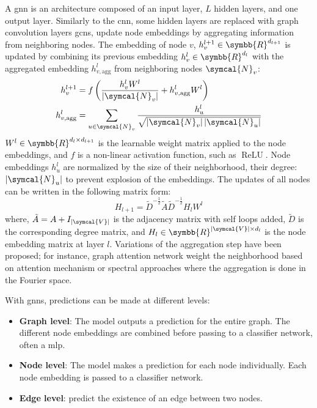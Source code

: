 \documentclass[../main.tex]{subfiles}
\begin{document}
		A \gls{gnn} is an architecture composed of an input layer, \(L\) hidden layers, and one output layer.
		Similarly to the \gls{cnn}, some hidden layers are replaced with graph convolution layers
		\Glspl{gcn}, update node embeddings by aggregating information from neighboring nodes.
		The embedding of node \(v\), \(h^{l+1}_{v} \in \symbb{R}^{d_{l+1}}\) is updated by combining its previous embedding \(h^{l}_{v} \in \symbb{R}^{d_{l}}\) with the aggregated embedding \(h^{l}_{v,\text{agg}}\) from neighboring nodes \(\symcal{N}_{v}\):
		\begin{align}
			h^{l+1}_{v}          & = f\left( \frac{h^{l}_{v}W^{l}}{\left|\symcal{N}_{v} \right|} + h^{l}_{v,\text{agg}}W^{l}\right)                                    \\
			h^{l}_{v,\text{agg}} & = \sum_{u \in \symcal{N}_{v}} \frac{h^{l}_{u}}{\sqrt{\left|\symcal{N}_{v} \right|\left|\symcal{N}_{u} \right|}}
		\end{align}
		\(W^{l} \in \symbb{R}^{d_{l}\times d_{l+1}}\) is the learnable weight matrix applied to the node embeddings, and \(f\) is a non-linear activation function, such as \(\operatorname{ReLU}\).
		Node embeddings \(h_{u}^{l}\) are normalized by the size of their neighborhood, \ie{}their degree: \(\left|\symcal{N}_{u} \right|\) to prevent explosion of the embeddings.
		The updates of all nodes can be written in the following matrix form:
		\begin{equation}
			H_{l+1} = \tilde{D}^{-\tfrac12}\tilde{A}\tilde{D}^{-\tfrac12}H_{l}W^{l}
		\end{equation}
		where, \(\tilde{A} = A + I_{\left|\symcal{V}\right|}\) is the adjacency matrix with self loops added, \(\tilde{D}\) is the corresponding degree matrix, and \(H_{l} \in \symbb{R}^{\left|\symcal{V}\right| \times d_{l}}\) is the node embedding matrix at layer \(l\).
		Variations of the aggregation step have been proposed; for instance, graph attention network weight the neighborhood based on attention mechanism or spectral approaches where the aggregation is done in the Fourier space.

		With \glspl{gnn}, predictions can be made at different levels:
		\begin{itemize}[nosep]
			\item \textbf{Graph level}: The model outputs a prediction for the entire graph.
				The different node embeddings are combined before passing to a classifier network, often a \gls{mlp}.
			\item \textbf{Node level}: The model makes a prediction for each node individually.
				Each node embedding is passed to a classifier network.
			\item \textbf{Edge level}: predict the existence of an edge between two nodes.
		\end{itemize}
\end{document}
